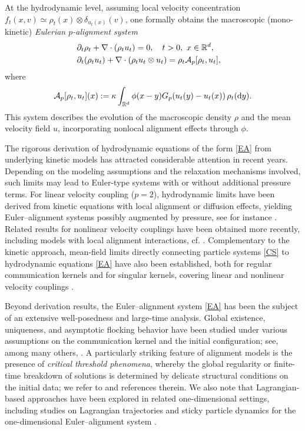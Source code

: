 \documentclass[10pt,reqno]{amsart}
\numberwithin{equation}{section}
\newcommand{\R}{\mathbb R}
\newcommand{\pa}{\partial}
\newcommand{\intr}{\int_{\R^d}}
\newcommand{\calA}{\mathcal A}
\newcommand{\dy}{\textnormal{d}y}
\begin{document}
At the hydrodynamic level, assuming local velocity concentration $f_t(x,v)\simeq \rho_t(x)\otimes \delta_{u_t(x)}(v)$, one formally obtains the macroscopic (mono-kinetic) \emph{Eulerian $p$-alignment system} \cite{LuTa23, Tad23}
\begin{align}\label{EA}
\begin{aligned}
&\pa_t \rho_t + \nabla \cdot (\rho_t u_t) = 0, \quad t>0, \ x \in \R^d, \cr
&\pa_t (\rho_t u_t) + \nabla \cdot (\rho_t u_t \otimes u_t) = \rho_t\calA_p[\rho_t,u_t],
\end{aligned}
\end{align}
where
\[
\calA_p[\rho_t,u_t](x) := \kappa \intr \phi(x-y) G_p(u_t(y) - u_t(x))\,\rho_t(\dy).
\]
This system describes the evolution of the macroscopic density $\rho$ and the mean velocity field $u$, incorporating nonlocal alignment effects through $\phi$. 

The rigorous derivation of hydrodynamic equations of the form \eqref{EA} from underlying kinetic models has attracted considerable attention in recent years. Depending on the modeling assumptions and the relaxation mechanisms involved, such limits may lead to Euler-type systems with or without additional pressure terms. For linear velocity coupling ($p=2$), hydrodynamic limits have been derived from kinetic equations with local alignment or diffusion effects, yielding Euler--alignment systems possibly augmented by pressure, see for instance \cite{CCJ21, CH24, CK23, FK19, KMT15}. Related results for nonlinear velocity couplings have been obtained more recently, including models with local alignment interactions, cf. \cite{BT25}. Complementary to the kinetic approach, mean-field limits directly connecting particle systems \eqref{CS} to hydrodynamic equations \eqref{EA} have also been established, both for regular communication kernels \cite{ACPSpre, CC21, Shv21} and for singular kernels, covering linear and nonlinear velocity couplings \cite{CFP25, FP24}. 

Beyond derivation results, the Euler--alignment system \eqref{EA} has been the subject of an extensive well-posedness and large-time analysis. Global existence, uniqueness, and asymptotic flocking behavior have been studied under various assumptions on the communication kernel and the initial configuration; see, among many others, \cite{CWZ19, CCTZ25, Cho19, CJu24, DMPW19, DKRT18, HT08, HKK15, KT18, LLST22,  LS19,  ST20, ST21,  ST17, ST18, Tad21, Tad23, TT14, WZpre}. A particularly striking feature of alignment models is the presence of
\emph{critical threshold phenomena}, whereby the global regularity or finite-time breakdown of solutions is determined by delicate structural conditions on the initial data; we refer to \cite{CCTT16, LTWpre, Tadpre, TT14, Tan20} and references therein. We also note that Lagrangian-based approaches have been explored in related
one-dimensional settings, including studies on Lagrangian trajectories \cite{Les20} and sticky particle dynamics for the one-dimensional Euler--alignment system \cite{Gal25, LT23}.
\end{document}
